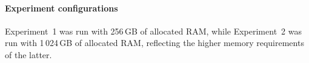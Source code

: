 




\paragraph*{Experiment configurations}
Experiment~1 was run with 256\,GB of allocated RAM, while Experiment~2 was run
with 1\,024\,GB of allocated RAM, reflecting the higher memory requirements of
the latter.



